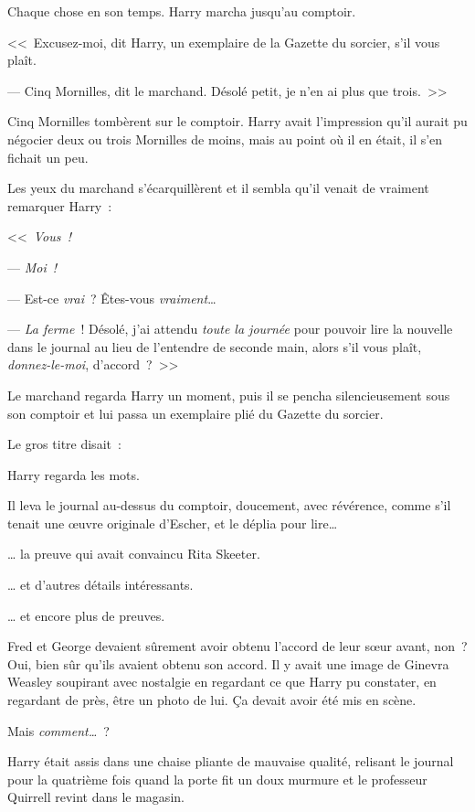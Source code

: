 Chaque chose en son temps. Harry marcha jusqu'au comptoir.

<<~Excusez-moi, dit Harry, un exemplaire de la Gazette du sorcier, s'il vous plaît.

--- Cinq Mornilles, dit le marchand. Désolé petit, je n'en ai plus que trois.~>>

Cinq Mornilles tombèrent sur le comptoir. Harry avait l'impression qu'il aurait pu négocier deux ou trois Mornilles de moins, mais au point où il en était, il s'en fichait un peu.

Les yeux du marchand s'écarquillèrent et il sembla qu'il venait de vraiment remarquer Harry~:

<<~\emph{Vous~!}

--- \emph{Moi~!}

--- Est-ce \emph{vrai}~? Êtes-vous \emph{vraiment}…

--- \emph{La ferme}~! Désolé, j'ai attendu \emph{toute la journée} pour pouvoir lire la nouvelle dans le journal au lieu de l'entendre de seconde main, alors s'il vous plaît, \emph{donnez-le-moi}, d'accord~?~>>

Le marchand regarda Harry un moment, puis il se pencha silencieusement sous son comptoir et lui passa un exemplaire plié du Gazette du sorcier.

Le gros titre disait~:

Harry regarda les mots.

Il leva le journal au-dessus du comptoir, doucement, avec révérence, comme s'il tenait une œuvre originale d'Escher, et le déplia pour lire…

… la preuve qui avait convaincu Rita Skeeter.

… et d'autres détails intéressants.

… et encore plus de preuves.

Fred et George devaient sûrement avoir obtenu l'accord de leur sœur avant, non~? Oui, bien sûr qu'ils avaient obtenu son accord. Il y avait une image de Ginevra Weasley soupirant avec nostalgie en regardant ce que Harry pu constater, en regardant de près, être un photo de lui. Ça devait avoir été mis en scène.

Mais \emph{comment…}~?

Harry était assis dans une chaise pliante de mauvaise qualité, relisant le journal pour la quatrième fois quand la porte fit un doux murmure et le professeur Quirrell revint dans le magasin.

